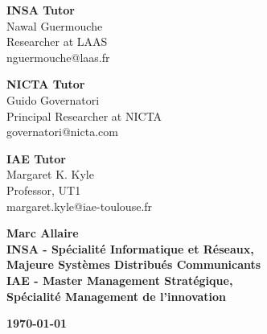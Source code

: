 \documentclass[10pt]{report}
\begin{document}
\begin{titlepage}
\begin{center}
\begin{minipage}{.3\textwidth}
\begin{center}
\textbf{INSA Tutor}\\
Nawal Guermouche\\
Researcher at LAAS\\
nguermouche@laas.fr
\end{center}
\end{minipage}
\begin{minipage}{.3\textwidth}
\begin{center}
\textbf{NICTA Tutor}\\
Guido Governatori\\
Principal Researcher at NICTA\\
governatori@nicta.com
\end{center}
\end{minipage}
\begin{minipage}{.3\textwidth}
\begin{center}
\textbf{IAE Tutor}\\
Margaret K. Kyle\\
Professor, UT1\\
margaret.kyle@iae-toulouse.fr
\end{center}
\end{minipage}
\end{center}



\vfill
\begin{minipage}{0.55\textwidth}
\begin{flushleft}
\textbf{\large Marc Allaire\\[.5cm] 
\small INSA - Spécialité Informatique et Réseaux,\\\hspace{.5cm}Majeure Systèmes Distribués Communicants\\
IAE - Master Management Stratégique,\\\hspace{.5cm}Spécialité Management de l'innovation}
\end{flushleft}
\end{minipage}
\begin{minipage}{0.4\textwidth}
\begin{flushright}
\textbf{\today}
\end{flushright}
\end{minipage}
\end{titlepage}
\newpage
{} %
\end{document}
